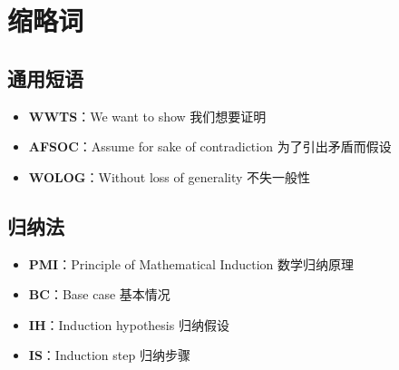 \section{缩略词}

\subsection{通用短语}

\begin{itemize}
    \item \textbf{WWTS}：We want to show 我们想要证明
    \item \textbf{AFSOC}：Assume for sake of contradiction 为了引出矛盾而假设
    \item \textbf{WOLOG}：Without loss of generality 不失一般性
\end{itemize}

\subsection{归纳法}

\begin{itemize}
    \item \textbf{PMI}：Principle of Mathematical Induction 数学归纳原理
    \item \textbf{BC}：Base case 基本情况
    \item \textbf{IH}：Induction hypothesis 归纳假设
    \item \textbf{IS}：Induction step 归纳步骤
\end{itemize}